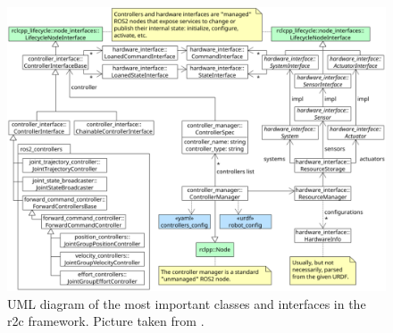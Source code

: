 \begin{figure}[htbp]
	\centering
	\includegraphics[width=1\textwidth]{Figures/c3/ros2_control_uml.png}
	\caption{UML diagram of the most important classes and interfaces in the \gls{r2c} framework. Picture taken from \cite{noauthor_welcome_nodate}. }
	\label{c3_fig_ros2_control_uml}
\end{figure}

